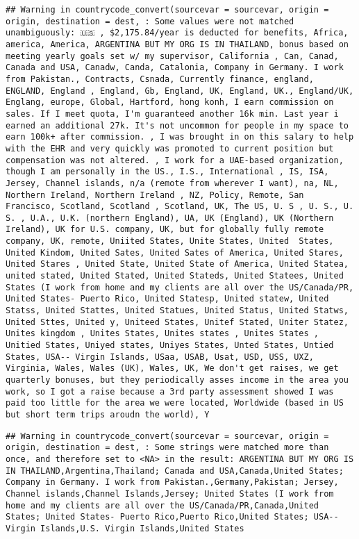\documentclass[
]{article}
\begin{document}
\begin{verbatim}
## Warning in countrycode_convert(sourcevar = sourcevar, origin = origin, destination = dest, : Some values were not matched unambiguously: 🇺🇸 , $2,175.84/year is deducted for benefits, Africa, america, America, ARGENTINA BUT MY ORG IS IN THAILAND, bonus based on meeting yearly goals set w/ my supervisor, California , Can, Canad, Canada and USA, Canadw, Canda, Catalonia, Company in Germany. I work from Pakistan., Contracts, Csnada, Currently finance, england, ENGLAND, England , England, Gb, England, UK, England, UK., England/UK, Englang, europe, Global, Hartford, hong konh, I earn commission on sales. If I meet quota, I'm guaranteed another 16k min. Last year i earned an additional 27k. It's not uncommon for people in my space to earn 100k+ after commission. , I was brought in on this salary to help with the EHR and very quickly was promoted to current position but compensation was not altered. , I work for a UAE-based organization, though I am personally in the US., I.S., International , IS, ISA, Jersey, Channel islands, n/a (remote from wherever I want), na, NL, Northern Ireland, Northern Ireland , NZ, Policy, Remote, San Francisco, Scotland, Scotland , Scotland, UK, The US, U. S , U. S., U. S. , U.A., U.K. (northern England), UA, UK (England), UK (Northern Ireland), UK for U.S. company, UK, but for globally fully remote company, UK, remote, Uniited States, Unite States, United  States, United Kindom, United Sates, United Sates of America, United Stares, United Stares , United State, United State of America, United Statea, united stated, United Stated, United Stateds, United Statees, United States (I work from home and my clients are all over the US/Canada/PR, United States- Puerto Rico, United Statesp, United statew, United Statss, United Stattes, United Statues, United Status, United Statws, United Sttes, United y, Uniteed States, Unitef Stated, Uniter Statez, Unites kingdom , Unites States, Unites states , Unites States , Unitied States, Uniyed states, Uniyes States, Unted States, Untied States, USA-- Virgin Islands, USaa, USAB, Usat, USD, USS, UXZ, Virginia, Wales, Wales (UK), Wales, UK, We don't get raises, we get quarterly bonuses, but they periodically asses income in the area you work, so I got a raise because a 3rd party assessment showed I was paid too little for the area we were located, Worldwide (based in US but short term trips aroudn the world), Y
\end{verbatim}

\begin{verbatim}
## Warning in countrycode_convert(sourcevar = sourcevar, origin = origin, destination = dest, : Some strings were matched more than once, and therefore set to <NA> in the result: ARGENTINA BUT MY ORG IS IN THAILAND,Argentina,Thailand; Canada and USA,Canada,United States; Company in Germany. I work from Pakistan.,Germany,Pakistan; Jersey, Channel islands,Channel Islands,Jersey; United States (I work from home and my clients are all over the US/Canada/PR,Canada,United States; United States- Puerto Rico,Puerto Rico,United States; USA-- Virgin Islands,U.S. Virgin Islands,United States
\end{verbatim}
\end{document}
